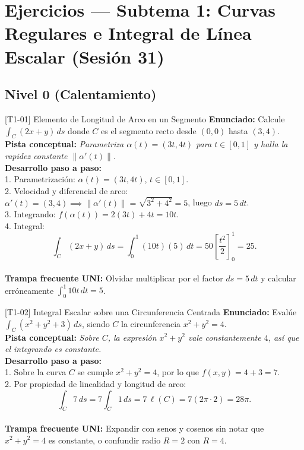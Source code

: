 \documentclass[11pt,a4paper]{article}
\begin{document}
\section{Ejercicios --- Subtema 1: Curvas Regulares e Integral de Línea Escalar (Sesión 31)}

\subsection{Nivel 0 (Calentamiento)}

\begin{ejerciciobox}{[T1-01] Elemento de Longitud de Arco en un Segmento}
\textbf{Enunciado:} Calcule $\int_C (2x + y)\,ds$ donde $C$ es el segmento recto desde $(0,0)$ hasta $(3,4)$.\\[0.2cm]
\textbf{Pista conceptual:} \emph{Parametriza $\alpha(t) = (3t, 4t)$ para $t \in [0, 1]$ y halla la rapidez constante $\|\alpha'(t)\|$.}\\[0.2cm]
\textbf{Desarrollo paso a paso:}\\
1. Parametrización: $\alpha(t) = (3t, 4t)$, $t \in [0,1]$.\\
2. Velocidad y diferencial de arco: $\alpha'(t) = (3, 4) \implies \|\alpha'(t)\| = \sqrt{3^2 + 4^2} = 5$, luego $ds = 5\,dt$.\\
3. Integrando: $f(\alpha(t)) = 2(3t) + 4t = 10t$.\\
4. Integral:\\
$$\int_C (2x + y)\,ds = \int_0^1 (10t)(5)\,dt = 50\left[\frac{t^2}{2}\right]_0^1 = 25.$$\\[0.2cm]
\textbf{Trampa frecuente UNI:} Olvidar multiplicar por el factor $ds = 5\,dt$ y calcular erróneamente $\int_0^1 10t\,dt = 5$.
\end{ejerciciobox}

\begin{ejerciciobox}{[T1-02] Integral Escalar sobre una Circunferencia Centrada}
\textbf{Enunciado:} Evalúe $\int_C (x^2 + y^2 + 3)\,ds$, siendo $C$ la circunferencia $x^2 + y^2 = 4$.\\[0.2cm]
\textbf{Pista conceptual:} \emph{Sobre $C$, la expresión $x^2 + y^2$ vale constantemente $4$, así que el integrando es constante.}\\[0.2cm]
\textbf{Desarrollo paso a paso:}\\
1. Sobre la curva $C$ se cumple $x^2 + y^2 = 4$, por lo que $f(x,y) = 4 + 3 = 7$.\\
2. Por propiedad de linealidad y longitud de arco:\\
$$\int_C 7\,ds = 7\int_C 1\,ds = 7\,\ell(C) = 7(2\pi \cdot 2) = 28\pi.$$\\[0.2cm]
\textbf{Trampa frecuente UNI:} Expandir con senos y cosenos sin notar que $x^2+y^2=4$ es constante, o confundir radio $R=2$ con $R=4$.
\end{ejerciciobox}
\end{document}
